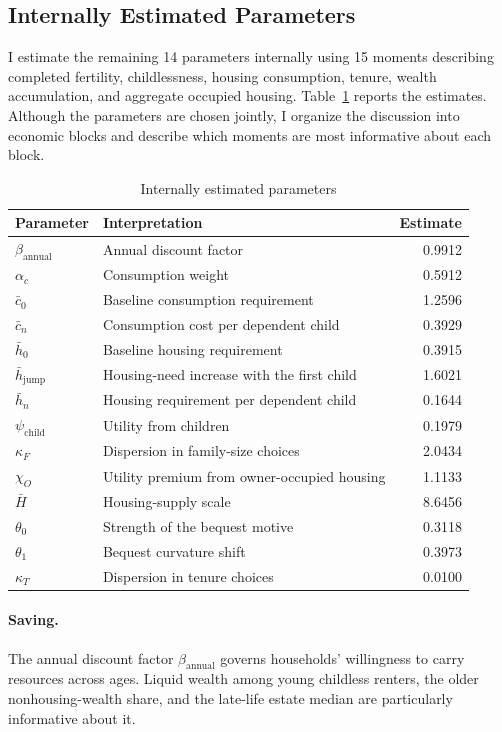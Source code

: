 \documentclass[11pt]{article}
\theoremstyle{definition}
\newcommand{\1}{\mathbf 1}
\begin{document}
\subsection{Internally Estimated Parameters}

I estimate the remaining 14 parameters internally using 15 moments describing
completed fertility, childlessness, housing consumption, tenure, wealth
accumulation, and aggregate occupied housing. Table~\ref{tab:quant_parameters}
reports the estimates. Although the parameters are chosen jointly, I organize
the discussion into economic blocks and describe which moments are most
informative about each block.

\begin{table}[H]
\centering
\caption{Internally estimated parameters}
\label{tab:quant_parameters}
\small
\begin{tabularx}{0.84\textwidth}{@{}l X r@{}}
\toprule
Parameter & Interpretation & Estimate \\
\midrule
$\beta_{\mathrm{annual}}$ & Annual discount factor & 0.9912 \\
$\alpha_c$ & Consumption weight & 0.5912 \\
$\bar c_0$ & Baseline consumption requirement & 1.2596 \\
$\bar c_n$ & Consumption cost per dependent child & 0.3929 \\
$\bar h_0$ & Baseline housing requirement & 0.3915 \\
$\bar h_{\mathrm{jump}}$ & Housing-need increase with the first child & 1.6021 \\
$\bar h_n$ & Housing requirement per dependent child & 0.1644 \\
$\psi_{\mathrm{child}}$ & Utility from children & 0.1979 \\
$\kappa_F$ & Dispersion in family-size choices & 2.0434 \\
$\chi_O$ & Utility premium from owner-occupied housing & 1.1133 \\
$\bar H$ & Housing-supply scale & 8.6456 \\
$\theta_0$ & Strength of the bequest motive & 0.3118 \\
$\theta_1$ & Bequest curvature shift & 0.3973 \\
$\kappa_T$ & Dispersion in tenure choices & 0.0100 \\
\bottomrule
\end{tabularx}
\end{table}

\paragraph{Saving.}
The annual discount factor $\beta_{\mathrm{annual}}$ governs households'
willingness to carry resources across ages. Liquid wealth among young childless
renters, the older nonhousing-wealth share, and the late-life estate median are
particularly informative about it.
\end{document}
